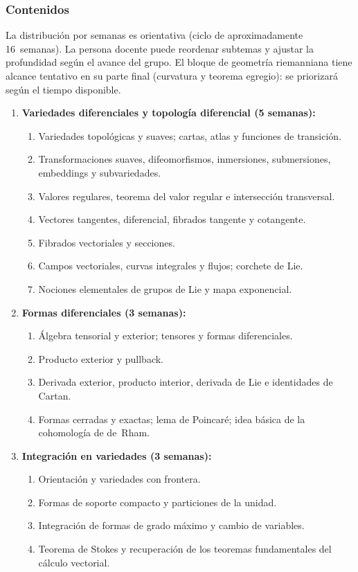 \begin{refsection}
\subsubsection*{Contenidos}

La distribución por semanas es orientativa (ciclo de aproximadamente 16~semanas). La persona docente puede reordenar subtemas y ajustar la profundidad según el avance del grupo. El bloque de geometría riemanniana tiene alcance tentativo en su parte final (curvatura y teorema egregio): se priorizará según el tiempo disponible.

\begin{enumerate}
\item \textbf{Variedades diferenciales y topología diferencial (5 semanas):}
\begin{enumerate}
    \item Variedades topológicas y suaves; cartas, atlas y funciones de transición.
    \item Transformaciones suaves, difeomorfismos, inmersiones, submersiones, embeddings y subvariedades.
    \item Valores regulares, teorema del valor regular e intersección transversal.
    \item Vectores tangentes, diferencial, fibrados tangente y cotangente.
    \item Fibrados vectoriales y secciones.
    \item Campos vectoriales, curvas integrales y flujos; corchete de Lie.
    \item Nociones elementales de grupos de Lie y mapa exponencial.
\end{enumerate}

\item \textbf{Formas diferenciales (3 semanas):}
\begin{enumerate}
    \item Álgebra tensorial y exterior; tensores y formas diferenciales.
    \item Producto exterior y pullback.
    \item Derivada exterior, producto interior, derivada de Lie e identidades de Cartan.
    \item Formas cerradas y exactas; lema de Poincaré; idea básica de la cohomología de de~Rham.
\end{enumerate}

\item \textbf{Integración en variedades (3 semanas):}
\begin{enumerate}
    \item Orientación y variedades con frontera.
    \item Formas de soporte compacto y particiones de la unidad.
    \item Integración de formas de grado máximo y cambio de variables.
    \item Teorema de Stokes y recuperación de los teoremas fundamentales del cálculo vectorial.
\end{enumerate}


\end{enumerate}
\end{refsection}
